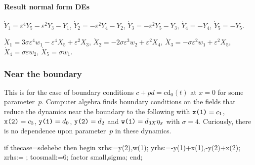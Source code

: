 \documentclass[11pt,a5paper]{article}
\begin{document}
\paragraph{Result normal form DEs}
\begin{math}
\dot Y_{1}=\varepsilon ^{4} Y_{5}-\varepsilon ^{2} Y_{3}-Y_{1}
\end{math},
\begin{math}
\dot Y_{2}=-\varepsilon ^{2} Y_{4}-Y_{2}
\end{math},
\begin{math}
\dot Y_{3}=-\varepsilon ^{2} Y_{5}-Y_{3}
\end{math},
\begin{math}
\dot Y_{4}=-Y_{4}
\end{math},
\begin{math}
\dot Y_{5}=-Y_{5}
\end{math}.

\begin{math}
\dot X_{1}=3 \sigma  \varepsilon ^{4} w_{1}-\varepsilon ^{4} X_{5}+
\varepsilon ^{2} X_{3}
\end{math},
\begin{math}
\dot X_{2}=-2 \sigma  \varepsilon ^{3} w_{2}+\varepsilon ^{2} X_{4}
\end{math},
\begin{math}
\dot X_{3}=-\sigma  \varepsilon ^{2} w_{1}+\varepsilon ^{2} X_{5}
\end{math},
\begin{math}
\dot X_{4}=\sigma  \varepsilon  w_{2}
\end{math},
\begin{math}
\dot X_{5}=\sigma  w_{1}
\end{math}.


\subsubsection{Near the boundary}
This is for the case of boundary conditions $c+pd=\text{cd}_0(t)$ at $x=0$ for some parameter~$p$.  
Computer algebra finds boundary conditions on the fields that reduce the dynamics near the boundary to the following with \(\verb|x(1)|=c_1\), \(\verb|x(2)|=c_3\), \(\verb|y(1)|=d_0\), \(\verb|y(2)|=d_2\) and \(\verb|w(1)|=d_{3X}\eta_x\) with \(\sigma=4\).
Curiously, there is no dependence upon parameter~$p$ in these dynamics.
\begin{reduce}
if thecase=sdehebc then begin
xrhs:={y(2),w(1)};
yrhs:={-y(1)+x(1),-y(2)+x(2)};
zrhs:={ };
toosmall:=6;
factor small,sigma;
end;
\end{reduce}
\end{document}

